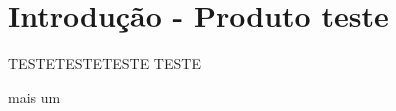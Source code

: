 	\thispagestyle{headfootimage}
	\section{Introdução - Produto teste	}
	
	
	TESTETESTETESTE
	TESTE

	mais um